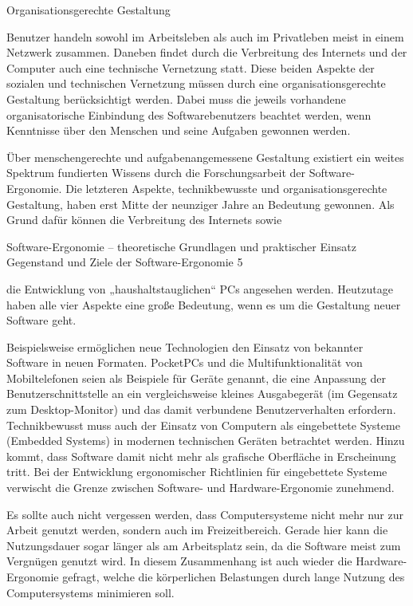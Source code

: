 \documentclass[a4paper, 12pt, twoside, BCOR=20mm, DIV=calc, abstracton, parskip=half*, toc=bibliography, toc=listof, headsepline, footsepline, headings=small, numbers=enddot]{scrreprt}
\begin{document}
		Organisationsgerechte Gestaltung
		
		Benutzer handeln sowohl im Arbeitsleben als auch im Privatleben meist in einem Netzwerk zusammen. Daneben findet durch die Verbreitung des Internets und der Computer auch eine technische Vernetzung statt. Diese beiden Aspekte der sozialen und technischen Vernetzung müssen durch eine organisationsgerechte Gestaltung berücksichtigt werden. Dabei muss die jeweils vorhandene organisatorische Einbindung des Softwarebenutzers beachtet werden, wenn Kenntnisse über den Menschen und seine Aufgaben gewonnen werden.
		
		Über menschengerechte und aufgabenangemessene Gestaltung existiert ein weites Spektrum fundierten Wissens durch die Forschungsarbeit der Software-Ergonomie. Die letzteren Aspekte, technikbewusste und organisationsgerechte Gestaltung, haben erst Mitte der neunziger Jahre an Bedeutung gewonnen. Als Grund dafür können die Verbreitung des Internets sowie
		
		Software-Ergonomie – theoretische Grundlagen und praktischer Einsatz Gegenstand und Ziele der Software-Ergonomie 5
		
		die Entwicklung von „haushaltstauglichen“ PCs angesehen werden. Heutzutage haben alle vier Aspekte eine große Bedeutung, wenn es um die Gestaltung neuer Software geht.
		
		Beispielsweise ermöglichen neue Technologien den Einsatz von bekannter Software in neuen Formaten. PocketPCs und die Multifunktionalität von Mobiltelefonen seien als Beispiele für Geräte genannt, die eine Anpassung der Benutzerschnittstelle an ein vergleichsweise kleines Ausgabegerät (im Gegensatz zum Desktop-Monitor) und das damit verbundene Benutzerverhalten erfordern. Technikbewusst muss auch der Einsatz von Computern als eingebettete Systeme (Embedded Systems) in modernen technischen Geräten betrachtet werden. Hinzu kommt, dass Software damit nicht mehr als grafische Oberfläche in Erscheinung tritt. Bei der Entwicklung ergonomischer Richtlinien für eingebettete Systeme verwischt die Grenze zwischen Software- und Hardware-Ergonomie zunehmend.
		
		Es sollte auch nicht vergessen werden, dass Computersysteme nicht mehr nur zur Arbeit genutzt werden, sondern auch im Freizeitbereich. Gerade hier kann die Nutzungsdauer sogar länger als am Arbeitsplatz sein, da die Software meist zum Vergnügen genutzt wird. In diesem Zusammenhang ist auch wieder die Hardware-Ergonomie gefragt, welche die körperlichen Belastungen durch lange Nutzung des Computersystems minimieren soll.
		
\end{document}
